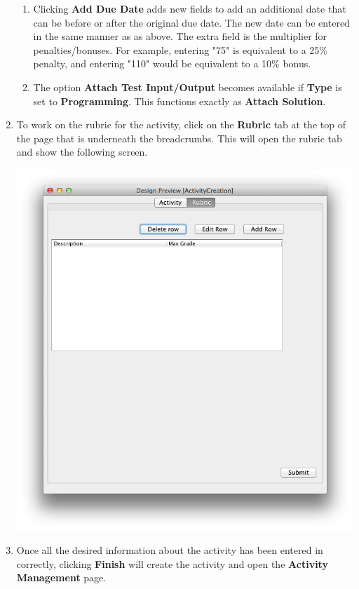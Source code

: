\documentclass{article}
\begin{document}
\begin{enumerate}
\begin{enumerate}
  \item Clicking \textbf{Add Due Date} adds new fields to add an additional
    date that can be before or after the original due date. The new date can
    be entered in the same manner as as above. The extra field is the multiplier
    for penalties/bonuses. For example, entering "75" is equivalent to a 25\%
    penalty, and entering "110" would be equivalent to a 10\% bonus.
  \item The option \textbf{Attach Test Input/Output} becomes available if \textbf{Type} 
  is set to \textbf{Programming}. This functions exactly as \textbf{Attach Solution}.
 \end{enumerate}
 \item To work on the rubric for the activity, click on the \textbf{Rubric} tab at the 
 top of the page that is underneath the breadcrumbs. This will open the rubric tab and 
 show the following screen.
 \begin{center} 
	\includegraphics[scale=0.55]{../images/UpdatedUIScreens/RubricCreation.png}
 \end{center}
 \item Once all the desired information about the activity has been entered
   in correctly, clicking \textbf{Finish} will create the activity and open
   the \textbf{Activity Management} page.
\end{enumerate}
\clearpage
\end{document}
